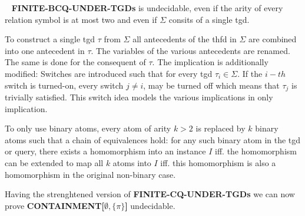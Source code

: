 \begin{theorem}\label{fundplus}~\cite{pichler2014containment}
	\textbf{FINITE-BCQ-UNDER-TGDs} is undecidable, even if the arity of every relation
	symbol is at most two and even if $\Sigma$ consits of a single tgd.
\end{theorem}

\begin{proofidea}
To construct a single tgd $\tau$ from $\Sigma$ all antecedents of the thfd in
$\Sigma$ are combined into one antecedent in $\tau$. The variables of the
various antecedents are renamed. The same is done for the consequent of $\tau$.
The implication is additionally modified: Switches are introduced such that for
every tgd $\tau_i \in \Sigma$. If the $i-th$ switch is turned-on, every switch
$j\neq i$, may be turned off which means that $\tau_j$ is trivially satisfied.
This switch idea models the various implications in only implication.

To only use binary atoms, every atom of arity $k>2$ is replaced by $k$ binary
atoms such that a chain of equivalences hold: for any such binary atom in the
tgd or query, there exists a homomorphism into an instance $I$ iff. the
homomorphism can be extended to map all $k$ atoms into $I$ iff. this
homomorphism is also a homomorphism in the original non-binary case.
\end{proofidea}

Having the strenghtened version of \textbf{FINITE-CQ-UNDER-TGDs} we can now prove
\textbf{CONTAINMENT[$\emptyset,\{\pi\}$]} undecidable.

